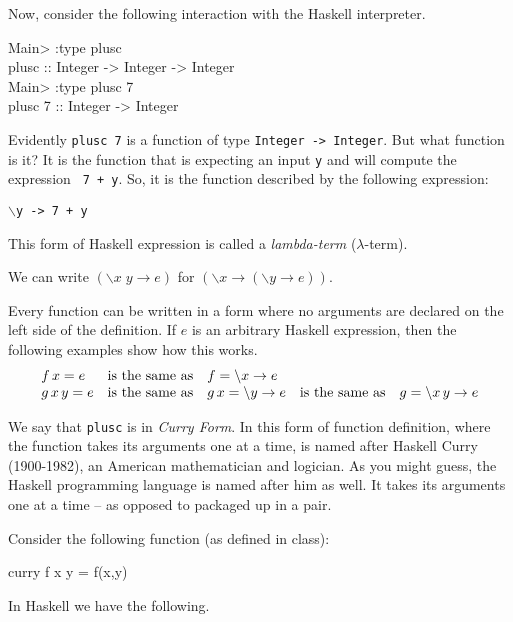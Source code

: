 \documentclass[11pt]{article}
\begin{document}
Now, consider the following interaction with the Haskell interpreter.
\begin{program*}
  \> Main> :type plusc    \\
  \> plusc :: Integer -> Integer -> Integer    \\
  \> Main> :type plusc 7    \\
  \> plusc 7 :: Integer -> Integer    \\
\end{program*}
Evidently {\tt{plusc 7}} is a function of type {\tt{Integer -> Integer}}.  But
what function is it?  It is the function that is expecting an input {\tt{y}}
and will compute the expression {\tt{ 7 + y}}.  So, it is the function
described by the following expression:\\ \begin{center}{\tt{$\backslash$y -> 7
+ y}} \end{center} This form of Haskell expression is called a
{\em{lambda-term}} ($\lambda$-term).

We can write $(\backslash x \; y \rightarrow e)$  for  $(\backslash x \rightarrow (\backslash y \rightarrow e))$.

Every function can be written in a form where no arguments are declared on the
left side of the definition.  If $e$ is an arbitrary Haskell expression, then
the following examples show how this works.
\[\begin{array}{lclcl}
f\, x = e & {\rm{is\ the\ same\ as }} & f = \backslash{}x \rightarrow e \\
g \, x \, y = e & {\rm{is\ the\ same\ as }} & g \, x = \backslash{}y \rightarrow e & {\rm{is\ the\ same\ as }} & g = \backslash{}x\, y \rightarrow e \\
\end{array}\]


We say that {\tt{plusc}} is in {\em{Curry Form}}.  In this form of function
definition, where the function takes its arguments one at a time, is named
after Haskell Curry (1900-1982), an American mathematician and logician.  As
you might guess, the Haskell programming language is named after him as well.
It takes its arguments one at a time -- as opposed to packaged up in a pair.


Consider the following function (as defined in class):
\begin{program*}
  \> curry f x y  =  f(x,y)
\end{program*}

In Haskell we have the following.
\end{document}
